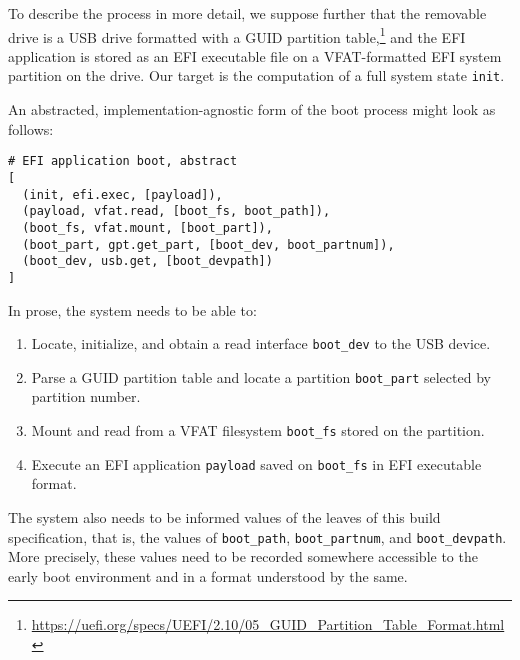 To describe the process in more detail, we suppose further that the removable drive is a USB drive formatted with a GUID partition table,\footnote{\url{https://uefi.org/specs/UEFI/2.10/05_GUID_Partition_Table_Format.html}} and the EFI application is stored as an EFI executable file on a VFAT-formatted EFI system partition on the drive.
%
Our target is the computation of a full system state \texttt{init}. 

An abstracted, implementation-agnostic form of the boot process might look as follows:
%
\begin{lstlisting}
# EFI application boot, abstract
[
  (init, efi.exec, [payload]),
  (payload, vfat.read, [boot_fs, boot_path]),
  (boot_fs, vfat.mount, [boot_part]),
  (boot_part, gpt.get_part, [boot_dev, boot_partnum]),
  (boot_dev, usb.get, [boot_devpath])
]
\end{lstlisting}
%
In prose, the system needs to be able to:
\begin{enumerate}
  \item Locate, initialize, and obtain a read interface \texttt{boot\_dev} to the USB device.
  \item Parse a GUID partition table and locate a partition \texttt{boot\_part} selected by partition number.
  \item Mount and read from a VFAT filesystem \texttt{boot\_fs} stored on the partition.
  \item Execute an EFI application \texttt{payload} saved on \texttt{boot\_fs} in EFI executable format.
\end{enumerate}
%
The system also needs to be informed values of the leaves of this build specification, that is, the values of \texttt{boot\_path}, \texttt{boot\_partnum}, and \texttt{boot\_devpath}.
%
More precisely, these values need to be recorded somewhere accessible to the early boot environment and in a format understood by the same.

